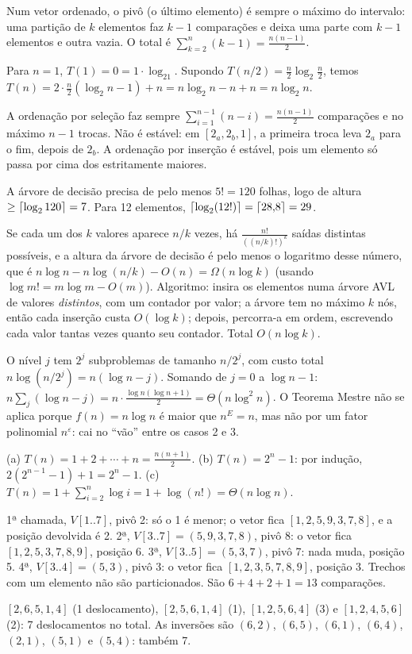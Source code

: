  Num vetor ordenado, o pivô (o último elemento) é sempre o máximo do intervalo: uma partição de $k$ elementos faz $k-1$ comparações e deixa uma parte com $k-1$ elementos e outra vazia. O total é $\sum_{k=2}^n(k-1)=\frac{n(n-1)}2$.

 Para $n=1$, $T(1)=0=1\cdot\log_21$. Supondo $T(n/2)=\frac n2\log_2\frac n2$, temos $T(n)=2\cdot\frac n2(\log_2n-1)+n=n\log_2n-n+n=n\log_2n$.

 A ordenação por seleção faz sempre $\sum_{i=1}^{n-1}(n-i)=\frac{n(n-1)}2$ comparações e no máximo $n-1$ trocas. Não é estável: em $[2_a,2_b,1]$, a primeira troca leva $2_a$ para o fim, depois de $2_b$. A ordenação por inserção é estável, pois um elemento só passa por cima dos estritamente maiores.

 A árvore de decisão precisa de pelo menos $5!=120$ folhas, logo de altura $\ge\lceil\log_2120\rceil=7$. Para 12 elementos, $\lceil\log_2(12!)\rceil=\lceil28{,}8\rceil=29$.

 Se cada um dos $k$ valores aparece $n/k$ vezes, há $\frac{n!}{((n/k)!)^k}$ saídas distintas possíveis, e a altura da árvore de decisão é pelo menos o logaritmo desse número, que é $n\log n-n\log(n/k)-O(n)=\Omega(n\log k)$ (usando $\log m!=m\log m-O(m)$). Algoritmo: insira os elementos numa árvore AVL de valores \emph{distintos}, com um contador por valor; a árvore tem no máximo $k$ nós, então cada inserção custa $O(\log k)$; depois, percorra-a em ordem, escrevendo cada valor tantas vezes quanto seu contador. Total $O(n\log k)$.

 O nível $j$ tem $2^j$ subproblemas de tamanho $n/2^j$, com custo total $n\log(n/2^j)=n(\log n-j)$. Somando de $j=0$ a $\log n-1$: $n\sum_{j}(\log n-j)=n\cdot\frac{\log n(\log n+1)}2=\Theta(n\log^2n)$. O Teorema Mestre não se aplica porque $f(n)=n\log n$ é maior que $n^E=n$, mas não por um fator polinomial $n^\varepsilon$: cai no ``vão'' entre os casos 2 e 3.

 (a) $T(n)=1+2+\cdots+n=\frac{n(n+1)}2$. (b) $T(n)=2^n-1$: por indução, $2(2^{n-1}-1)+1=2^n-1$. (c) $T(n)=1+\sum_{i=2}^n\log i=1+\log(n!)=\Theta(n\log n)$.

 1ª chamada, $V[1..7]$, pivô 2: só o 1 é menor; o vetor fica $[1,2,5,9,3,7,8]$, e a posição devolvida é 2. 2ª, $V[3..7]=(5,9,3,7,8)$, pivô 8: o vetor fica $[1,2,5,3,7,8,9]$, posição 6. 3ª, $V[3..5]=(5,3,7)$, pivô 7: nada muda, posição 5. 4ª, $V[3..4]=(5,3)$, pivô 3: o vetor fica $[1,2,3,5,7,8,9]$, posição 3. Trechos com um elemento não são particionados. São $6+4+2+1=13$ comparações.

 $[2,6,5,1,4]$ (1 deslocamento), $[2,5,6,1,4]$ (1), $[1,2,5,6,4]$ (3) e $[1,2,4,5,6]$ (2): 7 deslocamentos no total. As inversões são $(6,2)$, $(6,5)$, $(6,1)$, $(6,4)$, $(2,1)$, $(5,1)$ e $(5,4)$: também 7.
